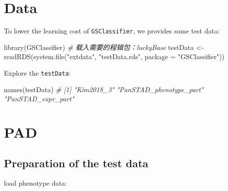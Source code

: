 \documentclass[
  12pt,
]{book}
\newenvironment{Shaded}{\begin{snugshade}}{\end{snugshade}}
\newcommand{\AttributeTok}[1]{\textcolor[rgb]{0.77,0.63,0.00}{#1}}
\newcommand{\CommentTok}[1]{\textcolor[rgb]{0.56,0.35,0.01}{\textit{#1}}}
\newcommand{\FunctionTok}[1]{\textcolor[rgb]{0.00,0.00,0.00}{#1}}
\newcommand{\NormalTok}[1]{#1}
\newcommand{\OtherTok}[1]{\textcolor[rgb]{0.56,0.35,0.01}{#1}}
\newcommand{\SpecialCharTok}[1]{\textcolor[rgb]{0.00,0.00,0.00}{#1}}
\newcommand{\StringTok}[1]{\textcolor[rgb]{0.31,0.60,0.02}{#1}}
\begin{document}
\hypertarget{data}{%
\section{Data}\label{data}}

To lower the learning cost of \texttt{GSClassifier}, we provides some test data:

\begin{Shaded}
\begin{Highlighting}[]
\FunctionTok{library}\NormalTok{(GSClassifier)}
\CommentTok{\# 载入需要的程辑包：luckyBase}
\NormalTok{testData }\OtherTok{\textless{}{-}} \FunctionTok{readRDS}\NormalTok{(}\FunctionTok{system.file}\NormalTok{(}\StringTok{"extdata"}\NormalTok{, }\StringTok{"testData.rds"}\NormalTok{, }\AttributeTok{package =} \StringTok{"GSClassifier"}\NormalTok{))}
\end{Highlighting}
\end{Shaded}

Explore the \texttt{testData}:

\begin{Shaded}
\begin{Highlighting}[]
\FunctionTok{names}\NormalTok{(testData)}
\CommentTok{\# [1] "Kim2018\_3"              "PanSTAD\_phenotype\_part" "PanSTAD\_expr\_part"}
\end{Highlighting}
\end{Shaded}

\hypertarget{pad}{%
\section{PAD}\label{pad}}

\hypertarget{preparation-of-the-test-data}{%
\subsection{Preparation of the test data}\label{preparation-of-the-test-data}}

load phenotype data:

\begin{Shaded}
\end{Shaded}
\end{document}
